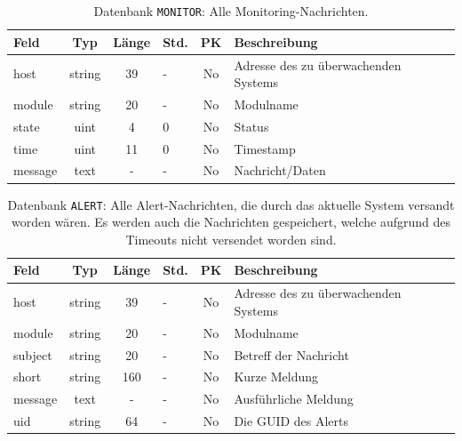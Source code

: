 \begin{table}[H]
\centering
\begin{tabular}{l|c|c|l|c|p{8cm}}
 \toprule
 Feld & Typ & L\"ange & Std. & PK & Beschreibung\\
 \midrule
 host & string & 39 & - & No & Adresse des zu \"uberwachenden Systems\\
 \midrule
 module & string & 20 & - & No & Modulname\\
 \midrule
 state & uint & 4 & 0 & No & Status\\
 \midrule
 time & uint & 11 & 0 & No & Timestamp\\
 \midrule
 message & text & - & - & No & Nachricht/Daten\\
 \bottomrule
\end{tabular}
\caption[Datenbank-Tabelle: MONITOR]{Datenbank \texttt{MONITOR}: Alle Monitoring-Nachrichten.}
\label{tbl:praxis-basis-data-table_monitor}
\end{table}

\begin{table}[H]
\centering
\begin{tabular}{l|c|c|l|c|p{7.5cm}}
 \toprule
 Feld & Typ & L\"ange & Std. & PK & Beschreibung\\
 \midrule
 host & string & 39 & - & No & Adresse des zu \"uberwachenden Systems\\
 \midrule
 module & string & 20 & - & No & Modulname\\
 \midrule
 subject & string & 20 & - & No & Betreff der Nachricht\\
 \midrule
 short & string & 160 & - & No & Kurze Meldung\\
 \midrule
 message & text & - & - & No & Ausf\"uhrliche Meldung\\
 \midrule
 uid & string & 64 & - & No & Die GUID des Alerts\\
 \bottomrule
\end{tabular}
\caption[Datenbank-Tabelle: ALERT]{Datenbank \texttt{ALERT}: Alle Alert-Nachrichten, die durch das aktuelle System versandt worden w\"aren. Es werden auch die Nachrichten gespeichert, welche aufgrund des Timeouts nicht versendet worden sind.}
\label{tbl:praxis-basis-data-table_alert}
\end{table}

